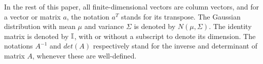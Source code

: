 In the rest of this paper, all finite-dimensional vectors are 
column vectors, and for a vector or matrix $a$, the notation $a^{T}$ stands for 
its transpose. The Gaussian distribution with mean $\mu$ and variance $\Sigma$ is denoted
by $N (\mu, \Sigma)$. The identity matrix  is denoted by ${\mathbb{I}}$, with or without a 
subscript to denote its dimension. The notations $A^{-1}$ and $det (A)$ respectively 
stand for the inverse and determinant of matrix $A$, whenever these are well-defined.

